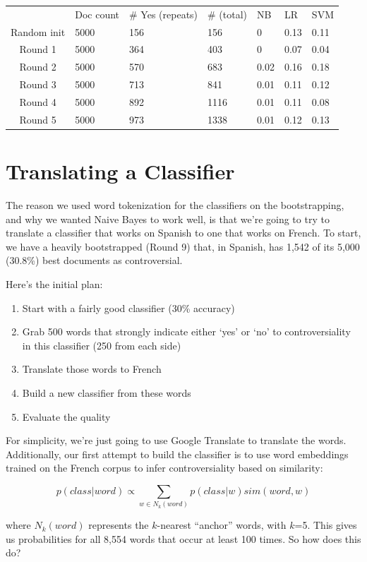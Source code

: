\documentclass[11pt]{article} %
\begin{document}
\begin{tabular}{|c|*{6}{l|}}
\rowcolor{gray!50} & Doc count & \# Yes (repeats) & \# (total) & NB & LR & SVM \\
Random init & 5000 & 156  & 156 & 0 & 0.13 & 0.11 \\
Round 1 & 5000 & 364 & 403 & 0 & 0.07 & 0.04 \\
Round 2 & 5000 & 570 & 683 & 0.02 & 0.16 & 0.18 \\
Round 3 & 5000 & 713 & 841 & 0.01 & 0.11 & 0.12 \\
Round 4 & 5000 & 892 & 1116 & 0.01 & 0.11 & 0.08 \\
Round 5 & 5000 & 973 & 1338 & 0.01 & 0.12 & 0.13 \\
\end{tabular}


\section{Translating a Classifier}
The reason we used word tokenization for the classifiers on the bootstrapping, and why we wanted Naive Bayes to work well, is that we're going to try to translate a classifier that works on Spanish to one that works on French. To start, we have a heavily bootstrapped (Round 9) that, in Spanish, has 1,542 of its 5,000 (30.8\%) best documents as controversial.

Here's the initial plan:
\begin{enumerate}
\item Start with a fairly good classifier (30\% accuracy)
\item Grab 500 words that strongly indicate either `yes' or `no' to controversiality in this classifier (250 from each side) 
\item Translate those words to French
\item Build a new classifier from these words
\item Evaluate the quality
\end{enumerate}

For simplicity, we're just going to use Google Translate to translate the words. Additionally, our first attempt to build the classifier is to use word embeddings trained on the French corpus to infer controversiality based on similarity:

\[ p(class|word) \propto \sum_{w\in N_k(word)} p(class|w) sim(word,w) \]

where $N_k(word)$ represents the $k$-nearest ``anchor'' words, with $k$=5. This gives us probabilities for all 8,554 words that occur at least 100 times. So how does this do?\\
\end{document}
